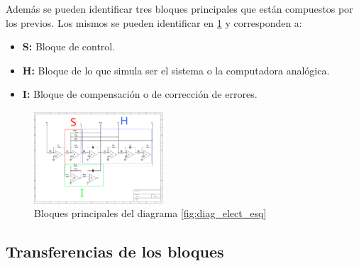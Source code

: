 \documentclass[letterpaper, 10 pt, conference]{ieeeconf}  %
\begin{document}
Además se pueden identificar tres bloques principales que están compuestos por los previos. Los mismos se pueden identificar en \ref{fig:diag_elec_esq_bloques_principales} y corresponden a:
\begin{itemize}
  \item \textbf{S:} Bloque de control.
  \item \textbf{H:} Bloque de lo que simula ser el sistema o la computadora analógica.
  \item \textbf{I:} Bloque de compensación o de corrección de errores.
\end{itemize}

\begin{figure}[H]
  \centering
  \includegraphics[width=0.43\textwidth]{./Imagenes/DiagElecEsquematicoBloquesPrincipales.png}
  \caption{Bloques principales del diagrama \ref{fig:diag_elect_esq}}
  \label{fig:diag_elec_esq_bloques_principales}
\end{figure}

\subsection{Transferencias de los bloques}
\end{document}
